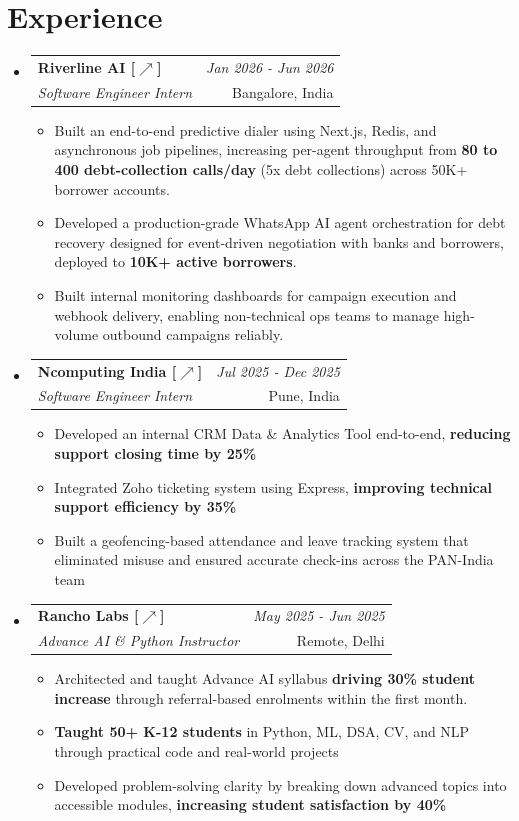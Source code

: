 \documentclass[a4paper,11pt]{article}
\makeatletter
\newcommand{\resumeSubheading}[4]{
\vspace{0.3mm}\item
    \begin{tabular*}{0.98\textwidth}[t]{l@{\extracolsep{\fill}}r}
        \textbf{#1} & \textit{\footnotesize{#4}} \\
        \textit{\footnotesize{#3}} &  \footnotesize{#2}\\
    \end{tabular*}
    \vspace{-2.4mm}
}
\newcommand{\resumeSubHeadingListStart}{\begin{itemize}[leftmargin=*,labelsep=1mm]}
\newcommand{\resumeItemListStart}{\begin{itemize}[leftmargin=*,labelsep=1mm,itemsep=0.4mm]}
\newcommand{\resumeSubHeadingListEnd}{\end{itemize}\vspace{1.5mm}}
\newcommand{\resumeItemListEnd}{\end{itemize}\vspace{-2mm}}
\makeatother
\begin{document}
\section{\textbf{Experience}}
\vspace{-0.4mm}
\resumeSubHeadingListStart
\resumeSubheading
    {Riverline AI [\href{https://riverline.ai}{$\nearrow$}]}{Bangalore, India}
    {Software Engineer Intern}{Jan 2026 - Jun 2026}
    \resumeItemListStart
      \item Built an end-to-end predictive dialer using Next.js, Redis, and asynchronous job pipelines, increasing per-agent throughput from \textbf{80 to 400 debt-collection calls/day} (5x debt collections) across 50K+ borrower accounts.
      \item Developed a production-grade WhatsApp AI agent orchestration for debt recovery designed for event-driven negotiation with banks and borrowers, deployed to \textbf{10K+ active borrowers}.
      \item Built internal monitoring dashboards for campaign execution and webhook delivery, enabling non-technical ops teams to manage high-volume outbound campaigns reliably.
    \resumeItemListEnd
\resumeSubheading
    {Ncomputing India [\href{https://www.ncomputing.com}{$\nearrow$}]}{Pune, India}
    {Software Engineer Intern}{Jul 2025 - Dec 2025}
    \resumeItemListStart
      \item Developed an internal CRM Data \& Analytics Tool end-to-end, \textbf{reducing support closing time by 25\%}
      \item Integrated Zoho ticketing system using Express, \textbf{improving technical support efficiency by 35\%}
      \item Built a geofencing-based attendance and leave tracking system that eliminated misuse and ensured accurate check-ins across the PAN-India team
    \resumeItemListEnd
\resumeSubheading
    {Rancho Labs [\href{https://rancholabs.com}{$\nearrow$}]}{Remote, Delhi}
    {Advance AI \& Python Instructor}{May 2025 - Jun 2025}
    \resumeItemListStart
      \item Architected and taught Advance AI syllabus \textbf{driving 30\% student increase} through referral-based enrolments within the first month.
      \item \textbf{Taught 50+ K-12 students} in Python, ML, DSA, CV, and NLP through practical code and real-world projects
      \item Developed problem-solving clarity by breaking down advanced topics into accessible modules, \textbf{increasing student satisfaction by 40\%}
    \resumeItemListEnd
\resumeSubHeadingListEnd
\vspace{-7mm}
\end{document}
